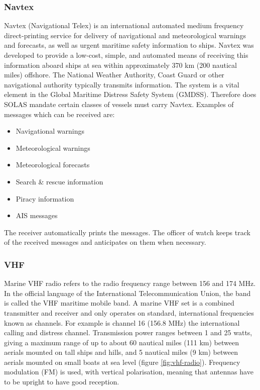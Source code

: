 \subsubsection{\acf{Navtex}}
Navtex (Navigational Telex) is an international automated medium frequency direct-printing service for delivery of navigational and meteorological warnings and forecasts, as well as urgent maritime safety information to ships. Navtex was developed to provide a low-cost, simple, and automated means of receiving this information aboard ships at sea within approximately 370 km (200 nautical miles) offshore.
The National Weather Authority, Coast Guard or other navigational authority typically transmits information.
The system is a vital element in the Global Maritime Distress Safety System (GMDSS). Therefore does \ac{SOLAS} mandate certain classes of vessels must carry Navtex. 
Examples of messages which can be received are:
\begin{multicols}{2}
	\begin{itemize}
		\item Navigational warnings
		\item Meteorological warnings
		\item Meteorological forecasts
		\item Search \& rescue information
		\item Piracy information
		\item \ac{AIS} messages
	\end{itemize}
\end{multicols}
The receiver automatically prints the messages. The officer of watch keeps track of the received messages and anticipates on them when necessary.

\subsubsection{\acf{VHF}}
Marine VHF radio refers to the radio frequency range between 156 and 174 MHz. In the official language of the International Telecommunication Union, the band is called the VHF maritime mobile band.
A marine VHF set is a combined transmitter and receiver and only operates on standard, international frequencies known as channels. For example is channel 16 (156.8 MHz) the international calling and distress channel. Transmission power ranges between 1 and 25 watts, giving a maximum range of up to about 60 nautical miles (111 km) between aerials mounted on tall ships and hills, and 5 nautical miles (9 km) between aerials mounted on small boats at sea level (figure \ref{fig:vhf-radio}). Frequency modulation (FM) is used, with vertical polarisation, meaning that antennas have to be upright to have good reception.

